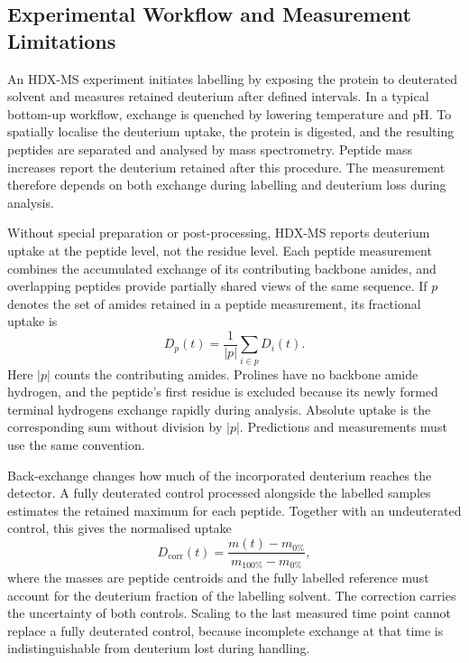 \subsection{Experimental Workflow and Measurement Limitations}
\label{sec:bg-hdx-workflow}

An HDX-MS experiment initiates labelling by exposing the protein to deuterated solvent and measures retained deuterium after defined intervals. In a typical bottom-up workflow, exchange is quenched by lowering temperature and pH. To spatially localise the deuterium uptake, the protein is digested, and the resulting peptides are separated and analysed by mass spectrometry. Peptide mass increases report the deuterium retained after this procedure. The measurement therefore depends on both exchange during labelling and deuterium loss during analysis.\supercite{massonRecommendationsPerformingInterpreting2019,vinciauskaiteFundamentalsHDXMS2023}

Without special preparation or post-processing, HDX-MS reports deuterium uptake at the peptide level, not the residue level. Each peptide measurement combines the accumulated exchange of its contributing backbone amides, and overlapping peptides provide partially shared views of the same sequence.\supercite{leeInterpretingHydrogenDeuteriumExchange2021} If $p$ denotes the set of amides retained in a peptide measurement, its fractional uptake is
\begin{equation}
    D_p(t)=\frac{1}{|p|}\sum_{i\in p}D_i(t).
    \label{eq:bg-peptide-uptake}
\end{equation}
Here $|p|$ counts the contributing amides. Prolines have no backbone amide hydrogen, and the peptide's first residue is excluded because its newly formed terminal hydrogens exchange rapidly during analysis. Absolute uptake is the corresponding sum without division by $|p|$. Predictions and measurements must use the same convention.\supercite{bradshawInterpretationHDXData2020}

Back-exchange changes how much of the incorporated deuterium reaches the detector. A fully deuterated control processed alongside the labelled samples estimates the retained maximum for each peptide. Together with an undeuterated control, this gives the normalised uptake
\begin{equation}
    D_{\text{corr}}(t)=
    \frac{m(t)-m_{0\%}}{m_{100\%}-m_{0\%}},
    \label{eq:bg-back-exchange}
\end{equation}
where the masses are peptide centroids and the fully labelled reference must account for the deuterium fraction of the labelling solvent.\supercite{massonRecommendationsPerformingInterpreting2019} The correction carries the uncertainty of both controls. Scaling to the last measured time point cannot replace a fully deuterated control, because incomplete exchange at that time is indistinguishable from deuterium lost during handling.

